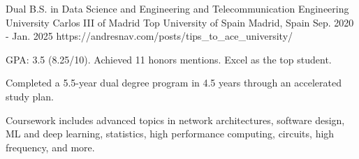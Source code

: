 

\begin{cventries}

	\cventry
	{Dual B.S. in  Data Science and Engineering and Telecommunication Engineering} %
	{University Carlos III of Madrid} %
	{Top University of Spain}
	{Madrid, Spain} %
	{Sep. 2020 - Jan. 2025} %
	{https://andresnav.com/posts/tips_to_ace_university/} %
	{
		\begin{cvitems} %
			\item {GPA: 3.5 (8.25/10). Achieved 11 honors mentions. Excel as the top student.}
			\item {Completed a 5.5-year dual degree program in 4.5 years through an accelerated study plan.}
			\item {Coursework includes advanced topics in network architectures, software design, ML and deep learning, statistics, high performance computing, circuits, high frequency, and more.}
		\end{cvitems}
	}


\end{cventries}
